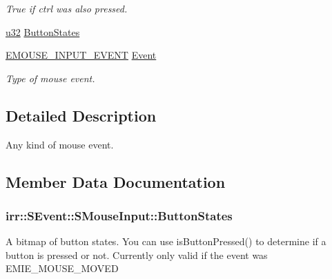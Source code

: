 \begin{DoxyCompactItemize}
\begin{DoxyCompactList}\small\item\em True if ctrl was also pressed. \end{DoxyCompactList}\item 
\hyperlink{namespaceirr_a0416a53257075833e7002efd0a18e804}{u32} \hyperlink{structirr_1_1SEvent_1_1SMouseInput_af2f4e21a673879db7f89335ccdc3efdd}{Button\+States}
\item 
\hyperlink{namespaceirr_a2dbf2a247aa17a9eeefbbf36ebd5739f}{E\+M\+O\+U\+S\+E\+\_\+\+I\+N\+P\+U\+T\+\_\+\+E\+V\+E\+NT} \hyperlink{structirr_1_1SEvent_1_1SMouseInput_adc389bcfee10b86dc5c6d2f39c4f5acd}{Event}\hypertarget{structirr_1_1SEvent_1_1SMouseInput_adc389bcfee10b86dc5c6d2f39c4f5acd}{}\label{structirr_1_1SEvent_1_1SMouseInput_adc389bcfee10b86dc5c6d2f39c4f5acd}

\begin{DoxyCompactList}\small\item\em Type of mouse event. \end{DoxyCompactList}\end{DoxyCompactItemize}


\subsection{Detailed Description}
Any kind of mouse event. 

\subsection{Member Data Documentation}
\subsubsection[{\texorpdfstring{Button\+States}{ButtonStates}}]{ irr\+::\+S\+Event\+::\+S\+Mouse\+Input\+::\+Button\+States}\hypertarget{structirr_1_1SEvent_1_1SMouseInput_af2f4e21a673879db7f89335ccdc3efdd}{}\label{structirr_1_1SEvent_1_1SMouseInput_af2f4e21a673879db7f89335ccdc3efdd}
A bitmap of button states. You can use is\+Button\+Pressed() to determine if a button is pressed or not. Currently only valid if the event was E\+M\+I\+E\+\_\+\+M\+O\+U\+S\+E\+\_\+\+M\+O\+V\+ED 
